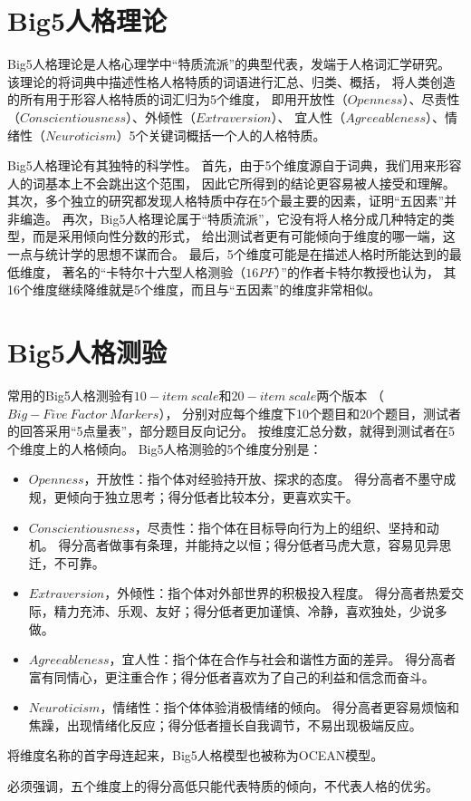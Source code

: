 \documentclass[UTF8]{ctexart}
\begin{document}
\section{Big5人格理论}
Big5人格理论是人格心理学中“特质流派”的典型代表，发端于人格词汇学研究。
该理论的将词典中描述性格人格特质的词语进行汇总、归类、概括，
将人类创造的所有用于形容人格特质的词汇归为5个维度，
即用开放性（$Openness$）、尽责性（$Conscientiousness$）、外倾性（$Extraversion$）、
宜人性（$Agreeableness$）、情绪性（$Neuroticism$）5个关键词概括一个人的人格特质。\par
Big5人格理论有其独特的科学性。
首先，由于5个维度源自于词典，我们用来形容人的词基本上不会跳出这个范围，
因此它所得到的结论更容易被人接受和理解。
其次，多个独立的研究都发现人格特质中存在5个最主要的因素，证明“五因素”并非编造。
再次，Big5人格理论属于“特质流派”，它没有将人格分成几种特定的类型，而是采用倾向性分数的形式，
给出测试者更有可能倾向于维度的哪一端，这一点与统计学的思想不谋而合。
最后，5个维度可能是在描述人格时所能达到的最低维度，
著名的“卡特尔十六型人格测验（$16PF$）”的作者卡特尔教授也认为，
其16个维度继续降维就是5个维度，而且与“五因素”的维度非常相似。
\section{Big5人格测验}
常用的Big5人格测验有$10-item\ scale$和$20-item\ scale$两个版本
（\href{https://ipip.ori.org/newBigFive5broadKey.htm}{$Big-Five\ Factor\ Markers$}），
分别对应每个维度下10个题目和20个题目，测试者的回答采用“5点量表”，部分题目反向记分。
按维度汇总分数，就得到测试者在5个维度上的人格倾向。
Big5人格测验的5个维度分别是：
\begin{itemize}
  \item $Openness$，开放性：指个体对经验持开放、探求的态度。
        得分高者不墨守成规，更倾向于独立思考；得分低者比较本分，更喜欢实干。
  \item $Conscientiousness$，尽责性：指个体在目标导向行为上的组织、坚持和动机。
        得分高者做事有条理，并能持之以恒；得分低者马虎大意，容易见异思迁，不可靠。
  \item $Extraversion$，外倾性：指个体对外部世界的积极投入程度。
        得分高者热爱交际，精力充沛、乐观、友好；得分低者更加谨慎、冷静，喜欢独处，少说多做。
  \item $Agreeableness$，宜人性：指个体在合作与社会和谐性方面的差异。
        得分高者富有同情心，更注重合作；得分低者喜欢为了自己的利益和信念而奋斗。
  \item $Neuroticism$，情绪性：指个体体验消极情绪的倾向。
        得分高者更容易烦恼和焦躁，出现情绪化反应；得分低者擅长自我调节，不易出现极端反应。
\end{itemize}
将维度名称的首字母连起来，Big5人格模型也被称为OCEAN模型。\par
必须强调，五个维度上的得分高低只能代表特质的倾向，不代表人格的优劣。
\end{document}
